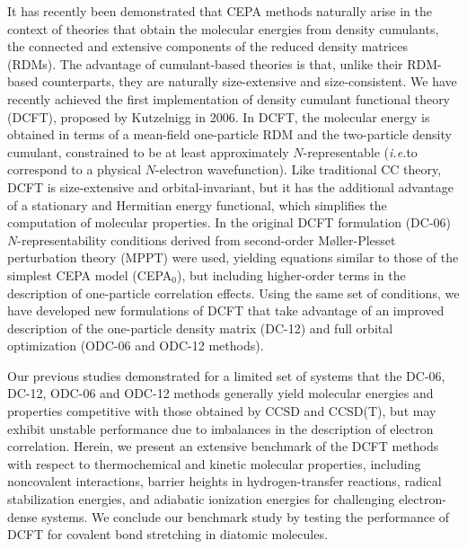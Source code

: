 It has recently been
demonstrated\cite{Kutzelnigg:2006p171101,Mazziotti:2008p253002,Mazziotti:2010p062515,DePrince:2012p1917}
that CEPA methods naturally arise in the context of theories that obtain the
molecular energies from density cumulants, the connected and extensive
components of the reduced density matrices
(RDMs).\cite{Kutzelnigg:1997p432,Mazziotti:1998p419,Mazziotti:1998p4219,Kutzelnigg:1999p2800,Kong:2011p3541,Hanauer:2012p50}
The advantage of cumulant-based theories is that, unlike their RDM-based
counterparts,\cite{Nakata:2009p042109,vanAggelen:2010p114112,Verstichel:2010p114113}
they are naturally size-extensive and
size-consistent.\cite{Kutzelnigg:1999p2800,Herbert:2007p261}
We have recently achieved the first
implementation\cite{Simmonett:2010p174122,Sokolov:2012p054105} of density
cumulant functional theory (DCFT), proposed by Kutzelnigg in
2006.\cite{Kutzelnigg:2006p171101}
In DCFT, the molecular energy is obtained in terms of a mean-field one-particle
RDM and the two-particle density cumulant, constrained to be at least
approximately $N$-representable ({\it i.e.}\@ to correspond to a physical
$N$-electron wavefunction).
Like traditional CC theory, DCFT is size-extensive and orbital-invariant, but it
has the additional advantage of a stationary and Hermitian energy functional,
which simplifies the computation of molecular properties.
In the original DCFT formulation
(DC-06)\cite{Kutzelnigg:2006p171101,Simmonett:2010p174122,Sokolov:2012p054105}
$N$-representability conditions derived from second-order M\o ller-Plesset
perturbation theory (MPPT) were used,\cite{Kutzelnigg:2004p7350} yielding
equations similar to those of the simplest CEPA model
(CEPA$_0$),\cite{Meyer:1973p1017,Koch:1981p387} but including higher-order terms
in the description of one-particle correlation effects.
Using the same set of conditions, we have developed new formulations of DCFT
that take advantage of an improved description of the one-particle density
matrix (DC-12)\cite{Sokolov:2013p024107} and full orbital optimization (ODC-06
and ODC-12 methods).\cite{Sokolov:2013p204110}

Our previous
studies\cite{Simmonett:2010p174122,Sokolov:2012p054105,Sokolov:2013p024107,Sokolov:2013p204110}
demonstrated for a limited set of systems that the DC-06, DC-12, ODC-06 and
ODC-12 methods generally yield molecular energies and properties competitive
with those obtained by CCSD and CCSD(T), but may exhibit unstable performance
due to imbalances in the description of electron correlation.
Herein, we present an extensive benchmark of the DCFT methods with respect to
thermochemical and kinetic molecular properties, including noncovalent
interactions, barrier heights in hydrogen-transfer reactions, radical
stabilization energies, and adiabatic ionization energies for challenging
electron-dense systems.
We conclude our benchmark study by testing the performance of DCFT for covalent
bond stretching in diatomic molecules.


